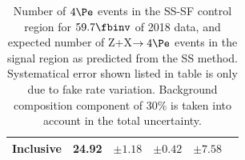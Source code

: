 \begin{table}[htb!]
\begin{center}
\begin{tabular}{ l | c | c | c | c | c }
\hline
\hline
Inclusive          & 24.92 & $\pm 1.18$ & $\pm 0.42 $  & $\pm 7.58 $ \\
\hline
\hline
\end{tabular}
\end{center}
\caption{Number of $4\Pe$ events in the SS-SF control region for $\usedLumiC$ of 2018 data, and expected number of Z+X$\to4\Pe$ events in the signal region as predicted from the SS method. Systematical error shown listed in table is only due to fake rate variation. Background composition component of 30\% is taken into account in the total uncertainty.
\label{tab:ZjetResultsAA_4e}}
\end{table}


